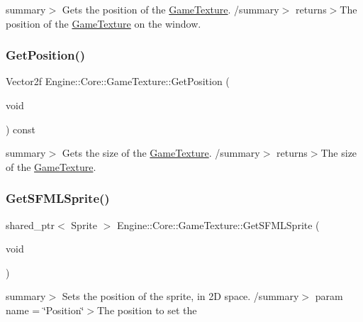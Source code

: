 summary$>$ Gets the position of the \hyperlink{class_engine_1_1_core_1_1_game_texture}{Game\+Texture}. /summary$>$ returns$>$The position of the \hyperlink{class_engine_1_1_core_1_1_game_texture}{Game\+Texture} on the window.\mbox{\label{class_engine_1_1_core_1_1_game_texture_a7bf5f66f2fd297fd9d757e8f9f0cc5e8}} 
\subsubsection{\texorpdfstring{Get\+Position()}{GetPosition()}}
{\footnotesize\ttfamily Vector2f Engine\+::\+Core\+::\+Game\+Texture\+::\+Get\+Position (\begin{DoxyParamCaption}\item[{void}]{ }\end{DoxyParamCaption}) const}

summary$>$ Gets the size of the \hyperlink{class_engine_1_1_core_1_1_game_texture}{Game\+Texture}. /summary$>$ returns$>$The size of the \hyperlink{class_engine_1_1_core_1_1_game_texture}{Game\+Texture}.\mbox{\label{class_engine_1_1_core_1_1_game_texture_aec2df0beae7b8693160e20c1fd3588ac}} 
\subsubsection{\texorpdfstring{Get\+S\+F\+M\+L\+Sprite()}{GetSFMLSprite()}}
{\footnotesize\ttfamily shared\+\_\+ptr$<$ Sprite $>$ Engine\+::\+Core\+::\+Game\+Texture\+::\+Get\+S\+F\+M\+L\+Sprite (\begin{DoxyParamCaption}\item[{void}]{ }\end{DoxyParamCaption})}

summary$>$ Sets the position of the sprite, in 2D space. /summary$>$ param name = \char`\"{}\+Position\char`\"{}$>$The position to set the \mbox{\label{class_engine_1_1_core_1_1_game_texture_a18a4679d1538d7390b613d16f3b4bd5a}} 
